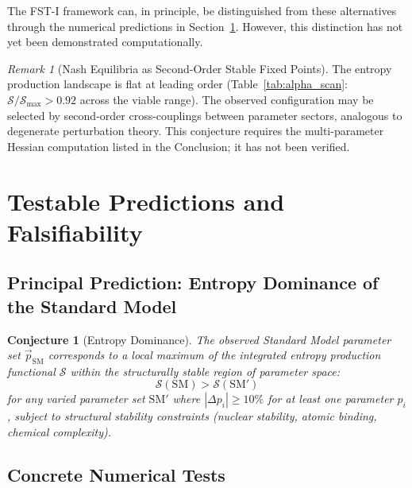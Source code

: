 \documentclass[12pt,a4paper]{article}
\newtheorem{conjecture}{Conjecture}
\theoremstyle{remark}
\newtheorem{remark}{Remark}
\begin{document}
The FST-I framework can, in principle, be distinguished from these alternatives through the numerical predictions in Section~\ref{sec:predictions}. However, this distinction has not yet been demonstrated computationally.

\begin{remark}[Nash Equilibria as Second-Order Stable Fixed Points]
\label{rem:degenerate-perturbation}
The entropy production landscape is flat at leading order (Table~\ref{tab:alpha_scan}: $\mathcal{S}/\mathcal{S}_{\max} > 0.92$ across the viable range). The observed configuration may be selected by second-order cross-couplings between parameter sectors, analogous to degenerate perturbation theory. This conjecture requires the multi-parameter Hessian computation listed in the Conclusion; it has not been verified.
\end{remark}

\section{Testable Predictions and Falsifiability}
\label{sec:predictions}

\subsection{Principal Prediction: Entropy Dominance of the Standard Model}

\begin{conjecture}[Entropy Dominance]
\label{conj:entropy-dominance}
The observed Standard Model parameter set $\vec{p}_{\mathrm{SM}}$ corresponds to a local maximum of the integrated entropy production functional $\mathcal{S}$ within the structurally stable region of parameter space:
\begin{equation}
\mathcal{S}(\mathrm{SM}) > \mathcal{S}(\mathrm{SM}')
\end{equation}
for any varied parameter set $\mathrm{SM}'$ where $|\Delta p_i| \geq 10\%$ for at least one parameter $p_i$, subject to structural stability constraints (nuclear stability, atomic binding, chemical complexity).
\end{conjecture}

\subsection{Concrete Numerical Tests}
\end{document}
